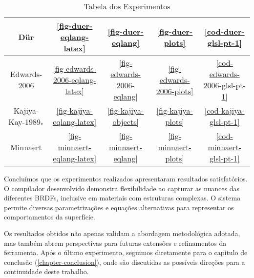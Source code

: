 \begin{table}[H]
\begin{tabular}{|c|c|c|c|c|}
    Dür                  & \autoref{fig-duer-eqlang-latex}                                  & \autoref{fig-duer-eqlang}                                 & \autoref{fig-duer-plots}                                 &                      \autoref{cod-duer-glsl-pt-1}              \\ \hline
    Edwards-2006         & \autoref{fig-edwards-2006-eqlang-latex}                          & \autoref{fig-edwards-2006-eqlang}                         & \autoref{fig-edwards-2006-plots}                         &              \autoref{cod-edwards-2006-glsl-pt-1}              \\ \hline
    Kajiya-Kay-1989$_*$  & \autoref{fig-kajiya-eqlang-latex}                                & \autoref{fig-kajiya-objects}                              & \autoref{fig-kajiya-plots}                               &                  \autoref{cod-kajiya-glsl-pt-1}              \\ \hline
    Minnaert             & \autoref{fig-minnaert-eqlang-latex}                              & \autoref{fig-minnaert-eqlang}                             & \autoref{fig-minnaert-plots}                             &                  \autoref{cod-minnaert-glsl-pt-1}              \\ \hline
\end{tabular}
\caption{Tabela dos Experimentos}
\label{table-experiments}
\end{table}


Concluímos que os experimentos realizados apresentaram resultados satisfatórios. O compilador desenvolvido demonstra flexibilidade ao capturar as nuances das diferentes BRDFs, inclusive em materiais com estruturas complexas. O sistema permite diversas parametrizações e equações alternativas para representar os comportamentos da superfície.

Os resultados obtidos não apenas validam a abordagem metodológica adotada, mas também abrem perspectivas para futuras extensões e refinamentos da ferramenta. Após o último experimento, seguimos diretamente para o capítulo de conclusão (\autoref{chapter-conclusion}), onde são discutidas as possíveis direções para a continuidade deste trabalho.


